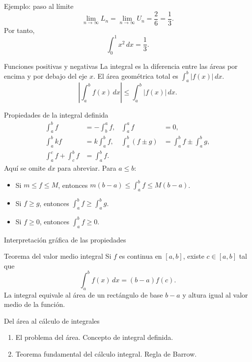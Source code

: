 \documentclass[main.tex]{subfiles}
\begin{document}
\begin{frame}{Ejemplo: paso al límite}
\[\lim_{n\to\infty}L_n=\lim_{n\to\infty}U_n=\frac26=\frac13.\]Por tanto,\[\boxed{\int_0^1 x^2\,dx=\frac13.}\]
\end{frame}

\begin{frame}{Funciones positivas y negativas}
La integral es la diferencia entre las áreas por encima y por debajo del eje $x$. El área geométrica total es $\int_a^b|f(x)|\,dx$.\[\left|\int_a^b f(x)\,dx\right|\le\int_a^b|f(x)|\,dx.\]
\end{frame}

\begin{frame}{Propiedades de la integral definida}
\footnotesize\begin{align*}\int_a^b f&=-\int_b^a f,&\int_a^a f&=0,\\ \int_a^b kf&=k\int_a^b f,&\int_a^b(f\pm g)&=\int_a^b f\pm\int_a^b g,\\ \int_a^c f+\int_c^b f&=\int_a^b f.\end{align*}Aquí se omite $dx$ para abreviar. Para $a\le b$:\begin{itemize}\item Si $m\le f\le M$, entonces $m(b-a)\le\int_a^b f\le M(b-a)$.\item Si $f\ge g$, entonces $\int_a^b f\ge\int_a^b g$.\item Si $f\ge0$, entonces $\int_a^b f\ge0$.\end{itemize}
\end{frame}

\begin{frame}{Interpretación gráfica de las propiedades}
\end{frame}

\begin{frame}{Teorema del valor medio integral}
Si $f$ es continua en $[a,b]$, existe $c\in[a,b]$ tal que\[\int_a^b f(x)\,dx=(b-a)f(c).\]La integral equivale al área de un rectángulo de base $b-a$ y altura igual al valor medio de la función.
\end{frame}

\begin{frame}{Del área al cálculo de integrales}
\begin{enumerate}\item El problema del área. Concepto de integral definida.\item Teorema fundamental del cálculo integral. Regla de Barrow.\end{enumerate}
\end{frame}
\end{document}
